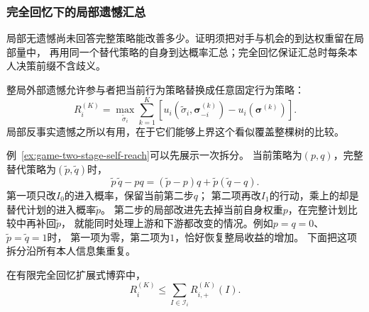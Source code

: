 \subsubsection{完全回忆下的局部遗憾汇总}
\label{sec:game-perfect-recall-regret}

局部无遗憾尚未回答完整策略能改善多少。证明须把对手与机会的到达权重留在局部量中，
再用同一个替代策略的自身到达概率汇总；完全回忆保证汇总时每条本人决策前缀不含歧义。

整局外部遗憾允许参与者把当前行为策略替换成任意固定行为策略：
\begin{equation}
  R_i^{(K)}
  =
  \max_{\widetilde{\sigma}_i}
  \sum_{k=1}^{K}
  \left[
    u_i(\widetilde{\sigma}_i,\bm{\sigma}_{-i}^{(k)})
    -
    u_i(\bm{\sigma}^{(k)})
  \right].
  \label{eq:game-extensive-external-regret}
\end{equation}
局部反事实遗憾之所以有用，在于它们能够上界这个看似覆盖整棵树的比较。

例~\ref{ex:game-two-stage-self-reach}可以先展示一次拆分。
当前策略为$(p,q)$，完整替代策略为$(\widetilde p,\widetilde q)$时，
\begin{equation}
 \widetilde p\,\widetilde q-pq
 =(\widetilde p-p)q+\widetilde p(\widetilde q-q).
 \label{eq:game-two-stage-deviation}
\end{equation}
第一项只改$I_0$的进入概率，保留当前第二步$q$；
第二项再改$I_1$的行动，乘上的却是替代计划的进入概率$\widetilde p$。
第二步的局部改进先去掉当前自身权重$p$，在完整计划比较中再补回$\widetilde p$，
就能同时处理上游和下游都改变的情况。例如$p=q=0$、$\widetilde p=\widetilde q=1$时，
第一项为零，第二项为$1$，恰好恢复整局收益的增加。
下面把这项拆分沿所有本人信息集重复。

\begin{theorem}[CFR的反事实遗憾分解]
\label{thm:game-cfr-decomposition}
在有限完全回忆扩展式博弈中，
\begin{equation}
  R_i^{(K)}
  \leq
  \sum_{I\in\mathcal{I}_i}
  R_{i,+}^{(K)}(I).
  \label{eq:game-cfr-global-bound}
\end{equation}
\end{theorem}

